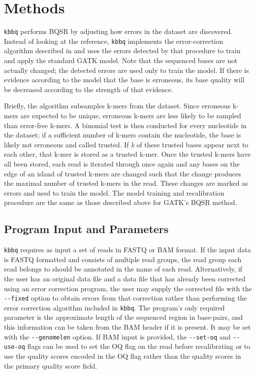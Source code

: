 \section{Methods}
\texttt{kbbq} performs BQSR by adjusting how errors in the dataset are discovered.
Instead of looking at the reference, \texttt{kbbq} implements the error-correction algorithm described in \cite{song_lighter_2014} and uses the errors detected by that procedure to train and apply the standard GATK model. Note that the sequenced bases are not actually changed; the detected errors are used only to train the model. If there is evidence according to the model that the base is erroneous, its base quality will be decreased according to the strength of that evidence.

Briefly, the algorithm subsamples k-mers from the dataset. Since erroneous k-mers are expected to be unique, erroneous k-mers are less likely to be sampled than error-free k-mers. A binomial test is then conducted for every nucleotide in the dataset; if a sufficient number of k-mers contain the nucleotide, the base is likely not erroneous and called trusted. If \textit{k} of these trusted bases appear next to each other, that k-mer is stored as a trusted k-mer. Once the trusted k-mers have all been stored, each read is iterated through once again and any bases on the edge of an island of trusted k-mers are changed such that the change produces the maximal number of trusted k-mers in the read. These changes are marked as errors and used to train the model.
The model training and recalibration procedure are the same as those described above for GATK's BQSR method.

\subsection{Program Input and Parameters}

\texttt{kbbq} requires as input a set of reads in FASTQ \parencite{cock_sanger_2010} or BAM \parencite{li_sequence_2009} format. If the input data is FASTQ formatted and consists of multiple read groups, the read group each read belongs to should be annotated in the name of each read. Alternatively, if the user has an original data file and a data file that has already been corrected using an error correction program, the user may supply the corrected file with the \texttt{-\phantom{}-fixed} option to obtain errors from that correction rather than performing the error correction algorithm included in \texttt{kbbq}. The program's only required parameter is the approximate length of the sequenced region in base-pairs, and this information can be taken from the BAM header if it is present. It may be set with the \texttt{-\phantom{}-genomelen} option. If BAM input is provided, the \texttt{-\phantom{}-set-oq} and \texttt{-\phantom{}-use-oq} flags can be used to set the OQ flag on the read before recalibrating or to use the quality scores encoded in the OQ flag rather than the quality scores in the primary quality score field.

